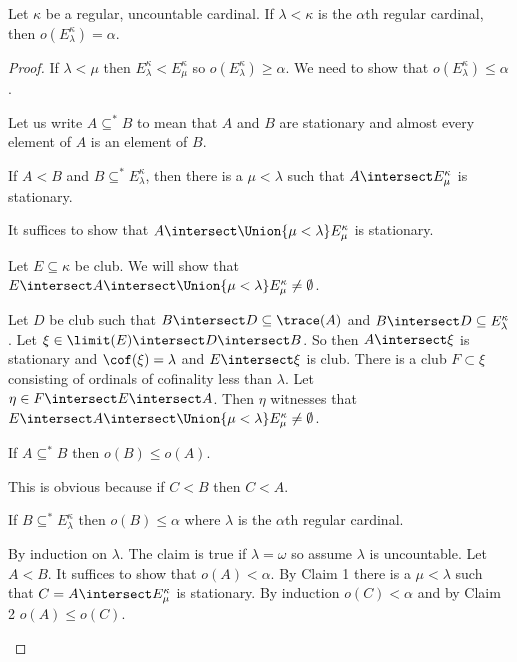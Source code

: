 \documentclass[oneside,12pt]{amsart}
\begin{document}
\begin{lemma}
\label{Exercise8.13}
Let $\kappa$ be a regular, uncountable cardinal.
If $\lambda<\kappa$ is the $\alpha$th regular cardinal, then $o(E^{\kappa}_{\lambda}) = \alpha$.
\end{lemma}
\begin{proof}
If $\lambda < \mu$ then $E^{\kappa}_{\lambda} < E^{\kappa}_{\mu}$ so $o(E^{\kappa}_{\lambda}) \geq \alpha$.
We need to show that $o(E^{\kappa}_{\lambda}) \leq \alpha$.

Let us write $A \subseteq^{*} B$ to mean that $A$ and $B$ are stationary and almost every element of $A$ is an element of $B$.

\begin{claim}[Claim 1]
If $A<B$ and $B \subseteq^{*} E^{\kappa}_{\lambda}$, then there is a $\mu<\lambda$ such that $A\intersect E^{\kappa}_{\mu}$ is stationary.
\end{claim}
\begin{subproof}
It suffices to show that $A\intersect \Union{\mu<\lambda}E^{\kappa}_{\mu}$ is stationary.

Let $E\subseteq \kappa$ be club. We will show that $E\intersect A \intersect \Union{\mu<\lambda}E^{\kappa}_{\mu} \not= \emptyset$.

Let $D$ be club such that $B\intersect D \subseteq \trace(A)$ and $B\intersect D \subseteq E^{\kappa}_{\lambda}$.
Let $\xi\in \limit(E) \intersect D \intersect B$. So then $A\intersect \xi$ is stationary and $\cof(\xi) = \lambda$ and
$E\intersect\xi$ is club. There is a club $F\subset \xi$ consisting of ordinals of cofinality less than $\lambda$.
Let $\eta\in F\intersect E \intersect A$. Then $\eta$ witnesses that
 $E\intersect A \intersect \Union{\mu<\lambda}E^{\kappa}_{\mu} \not= \emptyset$.
\end{subproof}

\begin{claim}[Claim 2]
If $A\subseteq^{*} B$ then $o(B)\leq o(A)$.
\end{claim}
\begin{subproof}
This is obvious because if $C < B$ then $C < A$.
\end{subproof}

\begin{claim}[Claim 3]
If $B\subseteq^{*}E^{\kappa}_{\lambda}$ then $o(B)\leq\alpha$ where $\lambda$ is the $\alpha$th regular cardinal.
\end{claim}
\begin{subproof}
By induction on $\lambda$. The claim is true if $\lambda=\omega$ so assume $\lambda $ is uncountable.
Let $A<B$. It suffices to show that $o(A)<\alpha$. By Claim 1 there is a
$\mu<\lambda$ such that $C = A\intersect E^{\kappa}_{\mu}$ is stationary. By induction $o(C) < \alpha$ and by
Claim 2 $o(A)\leq o(C)$.
\end{subproof}

\end{proof}
\end{document}
